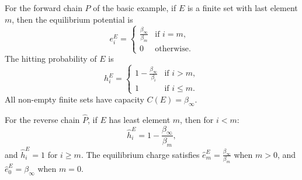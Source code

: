 For the forward chain $P$ of the basic example, if $E$ is a finite set with last element $m$, then the equilibrium potential is
$$e_i^E = \begin{cases} \frac{\beta_\infty}{\beta_m} & \text{if } i = m, \\ 0 & \text{otherwise}. \end{cases}$$
The hitting probability of $E$ is
$$h_i^E = \begin{cases} 1 - \frac{\beta_\infty}{\beta_i} & \text{if } i > m, \\ 1 & \text{if } i \leq m. \end{cases}$$
All non-empty finite sets have capacity $C(E) = \beta_\infty$.

For the reverse chain $\hat{P}$, if $E$ has least element $m$, then for $i < m$:
$$\hat{h}_i^E = 1 - \frac{\beta_\infty}{\beta_m},$$
and $\hat{h}_i^E = 1$ for $i \geq m$. The equilibrium charge satisfies $\hat{e}_m^E = \frac{\beta_\infty}{\beta_m}$ when $m > 0$, and $\hat{e}_0^E = \beta_\infty$ when $m = 0$.
